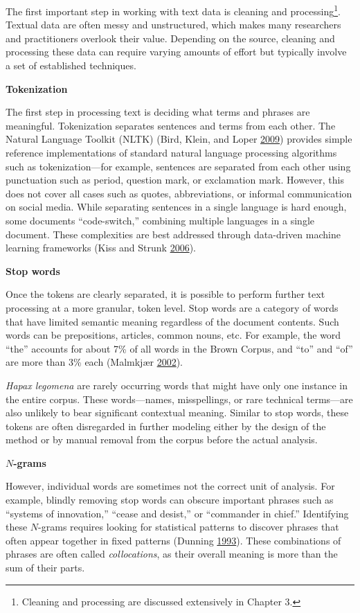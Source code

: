 \documentclass[]{krantz}
\begin{document}
The first important step in working with text data is cleaning and
processing\footnote{Cleaning and processing are discussed extensively in
  Chapter 3.}. Textual data are often messy and unstructured, which
makes many researchers and practitioners overlook their value. Depending
on the source, cleaning and processing these data can require varying
amounts of effort but typically involve a set of established techniques.

\textbf{Tokenization}

The first step in processing text is deciding what terms and phrases are
meaningful. Tokenization separates sentences and terms from each other.
The Natural Language Toolkit (NLTK) (Bird, Klein, and Loper
\protect\hyperlink{ref-bird-09}{2009}) provides simple reference
implementations of standard natural language processing algorithms such
as tokenization---for example, sentences are separated from each other
using punctuation such as period, question mark, or exclamation mark.
However, this does not cover all cases such as quotes, abbreviations, or
informal communication on social media. While separating sentences in a
single language is hard enough, some documents ``code-switch,''
combining multiple languages in a single document. These complexities
are best addressed through data-driven machine learning frameworks (Kiss
and Strunk \protect\hyperlink{ref-kiss-06}{2006}).

\textbf{Stop words}

Once the tokens are clearly separated, it is possible to perform further
text processing at a more granular, token level. Stop words are a
category of words that have limited semantic meaning regardless of the
document contents. Such words can be prepositions, articles, common
nouns, etc. For example, the word ``the'' accounts for about 7\% of all
words in the Brown Corpus, and ``to'' and ``of'' are more than 3\% each
(Malmkjær \protect\hyperlink{ref-malmkjar-02}{2002}).

\emph{Hapax legomena} are rarely occurring words that might have only
one instance in the entire corpus. These words---names, misspellings, or
rare technical terms---are also unlikely to bear significant contextual
meaning. Similar to stop words, these tokens are often disregarded in
further modeling either by the design of the method or by manual removal
from the corpus before the actual analysis.

\textbf{\(N\)-grams}

However, individual words are sometimes not the correct unit of
analysis. For example, blindly removing stop words can obscure important
phrases such as ``systems of innovation,'' ``cease and desist,'' or
``commander in chief.'' Identifying these \(N\)-grams requires looking
for statistical patterns to discover phrases that often appear together
in fixed patterns (Dunning \protect\hyperlink{ref-Dunning-93}{1993}).
These combinations of phrases are often called \emph{collocations}, as
their overall meaning is more than the sum of their parts.
\end{document}
